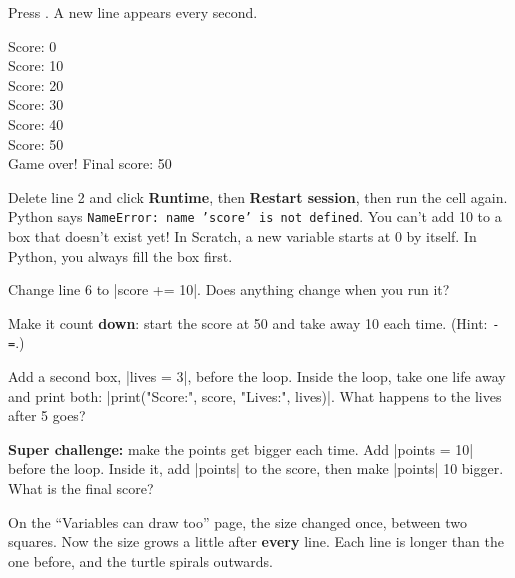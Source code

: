 Press \playbtn. A new line appears every second.

\noindent\begin{minipage}[t]{0.36\linewidth}\vspace{0pt}
\begin{outputbox}
Score: 0\\
Score: 10\\
Score: 20\\
Score: 30\\
Score: 40\\
Score: 50\\
Game over! Final score: 50
\end{outputbox}
\end{minipage}\hfill\begin{minipage}[t]{0.55\linewidth}\vspace{0pt}
\begin{think}
Delete line 2 and click \textbf{Runtime}, then \textbf{Restart session}, then run the cell again. Python says \texttt{NameError: name 'score' is not defined}. You can't add 10 to a box that doesn't exist yet! In Scratch, a new variable starts at 0 by itself. In Python, you always fill the box first.
\end{think}
\end{minipage}


\begin{challenge}
\tick Change line 6 to \py|score += 10|. Does anything change when you run it?\par
\tick Make it count \textbf{down}: start the score at 50 and take away 10 each time. (Hint: \texttt{-=}.)\par
\tick Add a second box, \py|lives = 3|, before the loop. Inside the loop, take one life away and print both: \py|print("Score:", score, "Lives:", lives)|. What happens to the lives after 5 goes?\par
\tick \textbf{Super challenge:} make the points get bigger each time. Add \py|points = 10| before the loop. Inside it, add \py|points| to the score, then make \py|points| 10 bigger. What is the final score?
\end{challenge}


On the ``Variables can draw too'' page, the size changed once, between two squares. Now the size grows a little after \textbf{every} line. Each line is longer than the one before, and the turtle spirals outwards.

